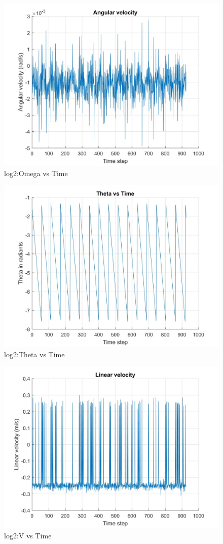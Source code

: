 \documentclass[paper=a4, fontsize=11pt]{scrartcl} %
\numberwithin{equation}{section} %
\numberwithin{figure}{section} %
\numberwithin{table}{section} %
\begin{document}
\begin{appendix}
\begin{figure}[H]
	\centering
	\includegraphics[width = 0.6\linewidth]{./figures/log2/omegaVsTime.jpg}
	\caption{log2:Omega vs Time}
\end{figure}

\begin{figure}[H]
	\centering
	\includegraphics[width = 0.6\linewidth]{./figures/log2/thetaVsTime.jpg}
	\caption{log2:Theta vs Time}
\end{figure}

\begin{figure}[H]
	\centering
	\includegraphics[width = 0.6\linewidth]{./figures/log2/vVsTime.jpg}
	\caption{log2:V vs Time}
\end{figure}


\end{appendix}
\end{document}
